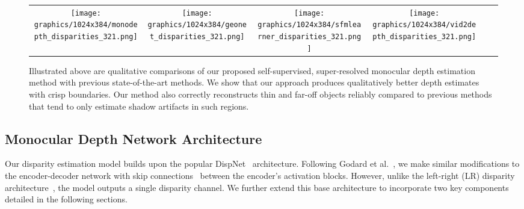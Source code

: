 \documentclass[letterpaper, 10 pt, conference]{ieeeconf}  \IEEEoverridecommandlockouts
\begin{document}
\begin{figure*}[!t]
{{\begin{tabular}{cccccc}
    \texttt{[image: graphics/1024x384/monodepth\_disparities\_321.png]}&
    \texttt{[image: graphics/1024x384/geonet\_disparities\_321.png]}&
    \texttt{[image: graphics/1024x384/sfmlearner\_disparities\_321.png]}&
    \texttt{[image: graphics/1024x384/vid2depth\_disparities\_321.png]}\\
\end{tabular}}}
  \caption{Illustrated above are qualitative comparisons of our proposed self-supervised, super-resolved monocular depth estimation method with previous state-of-the-art methods. We show that our approach produces qualitatively better depth estimates with crisp boundaries. Our method also correctly reconstructs thin and far-off objects reliably compared to previous methods that tend to only estimate shadow artifacts in such regions. }
  \label{fig:disparity-illustration2}
\vspace{-6mm}
\end{figure*}
 
\subsection{Monocular Depth Network Architecture}
\label{sec:proc-monodepth-architecture}
Our disparity estimation model builds upon the popular DispNet~\cite{mayer2016large} architecture. Following Godard et al.~\cite{godard2017unsupervised}, we make similar modifications to the encoder-decoder network with skip connections~\cite{long2015fully} between the encoder's activation blocks. However, unlike the left-right (LR) disparity architecture~\cite{godard2017unsupervised}, the model outputs a single disparity channel. We further extend this base architecture to incorporate two key components detailed in the following sections. 
\end{document}
